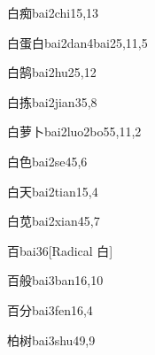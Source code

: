 \begin{verbete}{白痴}{bai2chi1}{5,13}
\end{verbete}

\begin{verbete}{白蛋白}{bai2dan4bai2}{5,11,5}
\end{verbete}

\begin{verbete}{白鹄}{bai2hu2}{5,12}
\end{verbete}

\begin{verbete}{白拣}{bai2jian3}{5,8}
\end{verbete}

\begin{verbete}{白萝卜}{bai2luo2bo5}{5,11,2}
\end{verbete}

\begin{verbete}{白色}{bai2se4}{5,6}
\end{verbete}

\begin{verbete}{白天}{bai2tian1}{5,4}
\end{verbete}

\begin{verbete}{白苋}{bai2xian4}{5,7}
\end{verbete}

\begin{verbete}{百}{bai3}{6}[Radical 白]
\end{verbete}

\begin{verbete}{百般}{bai3ban1}{6,10}
\end{verbete}

\begin{verbete}{百分}{bai3fen1}{6,4}
\end{verbete}

\begin{verbete}{柏树}{bai3shu4}{9,9}
\end{verbete}

